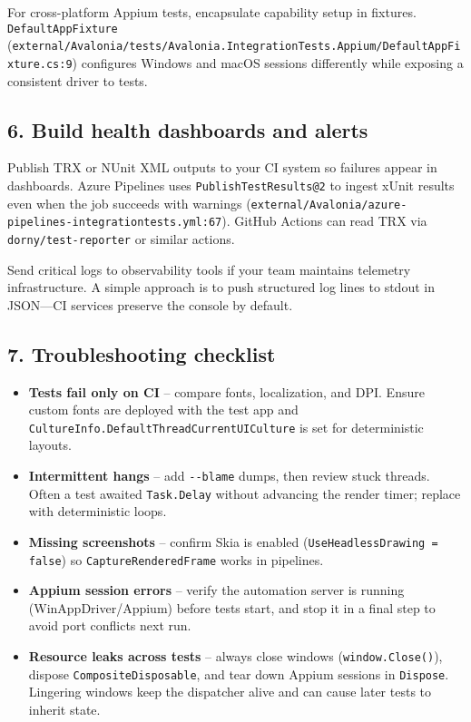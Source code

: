 For cross-platform Appium tests, encapsulate capability setup in
fixtures. \passthrough{\lstinline!DefaultAppFixture!}
(\passthrough{\lstinline!external/Avalonia/tests/Avalonia.IntegrationTests.Appium/DefaultAppFixture.cs:9!})
configures Windows and macOS sessions differently while exposing a
consistent driver to tests.

\subsection{6. Build health dashboards and
alerts}\label{build-health-dashboards-and-alerts}

Publish TRX or NUnit XML outputs to your CI system so failures appear in
dashboards. Azure Pipelines uses
\passthrough{\lstinline!PublishTestResults@2!} to ingest xUnit results
even when the job succeeds with warnings
(\passthrough{\lstinline!external/Avalonia/azure-pipelines-integrationtests.yml:67!}).
GitHub Actions can read TRX via
\passthrough{\lstinline!dorny/test-reporter!} or similar actions.

Send critical logs to observability tools if your team maintains
telemetry infrastructure. A simple approach is to push structured log
lines to stdout in JSON---CI services preserve the console by default.

\subsection{7. Troubleshooting
checklist}\label{troubleshooting-checklist-1}

\begin{itemize}
\tightlist
\item
  \textbf{Tests fail only on CI} -- compare fonts, localization, and
  DPI. Ensure custom fonts are deployed with the test app and
  \passthrough{\lstinline!CultureInfo.DefaultThreadCurrentUICulture!} is
  set for deterministic layouts.
\item
  \textbf{Intermittent hangs} -- add \passthrough{\lstinline!--blame!}
  dumps, then review stuck threads. Often a test awaited
  \passthrough{\lstinline!Task.Delay!} without advancing the render
  timer; replace with deterministic loops.
\item
  \textbf{Missing screenshots} -- confirm Skia is enabled
  (\passthrough{\lstinline!UseHeadlessDrawing = false!}) so
  \passthrough{\lstinline!CaptureRenderedFrame!} works in pipelines.
\item
  \textbf{Appium session errors} -- verify the automation server is
  running (WinAppDriver/Appium) before tests start, and stop it in a
  final step to avoid port conflicts next run.
\item
  \textbf{Resource leaks across tests} -- always close windows
  (\passthrough{\lstinline!window.Close()!}), dispose
  \passthrough{\lstinline!CompositeDisposable!}, and tear down Appium
  sessions in \passthrough{\lstinline!Dispose!}. Lingering windows keep
  the dispatcher alive and can cause later tests to inherit state.
\end{itemize}

